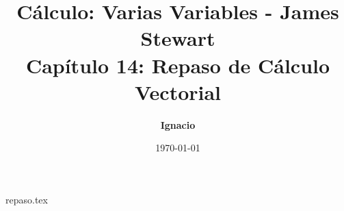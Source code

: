 \documentclass[11pt,spanish,oneside]{report}
\title{\textbf{Cálculo: Varias Variables - James Stewart} \\ \Large Capítulo 14: Repaso de Cálculo Vectorial}
\author{\textbf{Ignacio}}
\date{\today}
\begin{document}
\maketitle

{repaso.tex}
\end{document}
